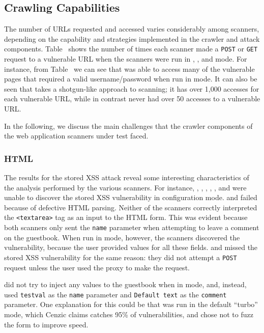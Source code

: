 
\subsection{Crawling Capabilities}

The number of URLs requested and accessed varies considerably among scanners,
depending on the capability and strategies implemented in the crawler and
attack components. Table~ shows the number of times each scanner
made a {\tt POST} or {\tt GET} request to a vulnerable URL when the scanners
were run in \initial{}, \config{}, and \manual{} mode.
For instance, from
Table~ we can see that \hailstorm{} was able to access many of the
vulnerable pages that required a valid username/password when run in \initial{} mode. It
can also be seen that \nstalker{} takes a shotgun-like approach to scanning;
it has over 1,000 accesses for each vulnerable URL, while in contrast
\grendelscan{} never had over 50 accesses to a vulnerable URL.  

In the following, we discuss the main challenges that the crawler components of the
web application scanners under test faced.


\subsubsection{HTML}
The results for the stored XSS attack reveal some interesting characteristics of
the analysis performed by the various scanners. For instance, \burp{}, \grendelscan{}, \hailstorm{},
\milescan{}, \nstalker{}, and \waf{} were unable to discover the stored XSS
vulnerability in \initial{} configuration mode. \burp{} and \nstalker{} failed
because of defective HTML parsing. Neither of the scanners correctly
interpreted the {\tt <textarea>} tag as an input to the HTML form. This
was evident because both scanners only sent the {\tt name} parameter when
attempting to leave a comment on the guestbook. When run in \manual{} mode,
however, the scanners discovered the
vulnerability, because the user provided values for all these fields. 
\grendelscan{} and \milescan{} missed the stored XSS vulnerability for
the same reason: they did not attempt a {\tt POST}
request unless the user used the proxy to make the request. 

\hailstorm{} did not try to inject any values to the guestbook when in
\initial{} mode, and, instead, used {\tt testval} as the {\tt name} parameter
and {\tt Default text} as the {\tt comment} parameter. One explanation for
this could be that \hailstorm{} was run in the default ``turbo'' mode, which
Cenzic claims catches 95\% of vulnerabilities, and chose not to fuzz
the form to improve speed.

